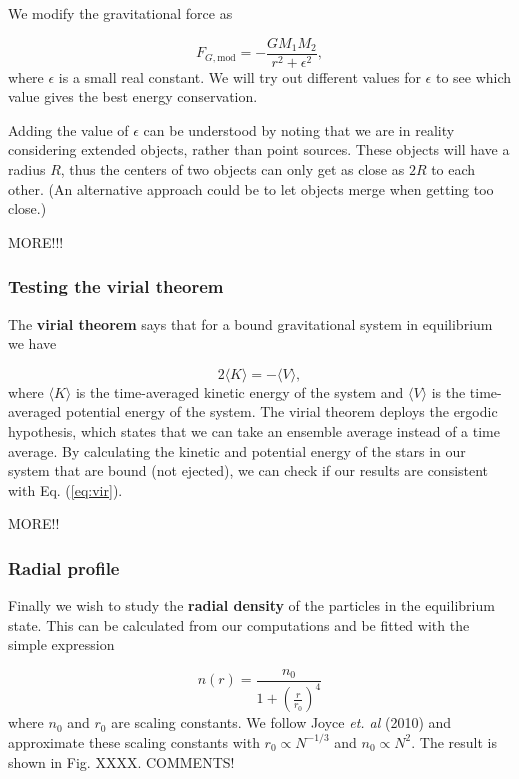 \documentclass{article}
\begin{document}
\begin{multicols}{2}
We modify the gravitational force as

\begin{equation}\label{eq:force_mod}
	F_{G,\mathrm{mod}} = - \frac{G M_1 M_2}{r^2 + \epsilon^2},
\end{equation}
where $\epsilon$ is a small real constant. We will try out different values for $\epsilon$ to see which value gives the best energy conservation.

Adding the value of $\epsilon$ can be understood by noting that we are in reality considering extended objects, rather than point sources. These objects will have a radius $R$, thus the centers of two objects can only get as close as $2R$ to each other. (An alternative approach could be to let objects merge when getting too close.) 

MORE!!!




\subsubsection{Testing the virial theorem}

The \textbf{virial theorem} says that for a bound gravitational system in equilibrium we have

\begin{equation}\label{eq:vir}
	2 \langle K \rangle = - \langle V \rangle,
\end{equation}
where $\langle K \rangle$ is the time-averaged kinetic energy of the system and $\langle V \rangle$ is the time-averaged potential energy of the system. The virial theorem deploys the ergodic hypothesis, which states that we can take an ensemble average instead of a time average. By calculating the kinetic and potential energy of the stars in our system that are bound (not ejected), we can check if our results are consistent with Eq. (\ref{eq:vir}).

MORE!!



\subsubsection{Radial profile}

Finally we wish to study the \textbf{radial density} of the particles in the equilibrium state. This can be calculated from our computations and be fitted with the simple expression

\begin{equation}\label{eq:simple_fit}
	n(r) = \frac{n_0}{1 + (\frac{r}{r_0})^4}
\end{equation}
where $n_0$ and $r_0$ are scaling constants. We follow Joyce \textit{et. al} (2010) and approximate these scaling constants with $r_0 \propto N^{-1/3}$ and $n_0 \propto N^2$. The result is shown in Fig. XXXX. COMMENTS!


\end{multicols}
\end{document}
